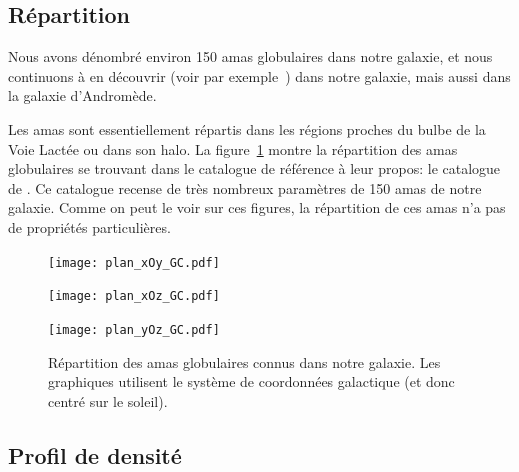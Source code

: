 		\subsection{Répartition}

			Nous avons dénombré environ 150 amas globulaires dans
			notre galaxie, et nous continuons à en découvrir (voir par
			exemple~\cite{2014ApJ...786L...3L}) dans notre galaxie, mais aussi dans la galaxie d'Andromède.

			Les amas sont essentiellement répartis dans les régions proches du
			bulbe de la Voie Lactée ou dans son halo.
			La figure~\ref{Fig::Intro::repartition} montre la répartition des amas
			globulaires se trouvant dans le catalogue de référence à leur propos: le
			catalogue de \cite{Harris}. Ce catalogue recense de très nombreux paramètres
			de 150 amas de notre galaxie.
			Comme on peut le voir sur ces figures, la répartition de ces amas n'a pas de propriétés particulières.

			\begin{figure}[h]
				\centering
					\begin{center}
				\begin{minipage}{0.33\linewidth}
						\texttt{[image: plan\_xOy\_GC.pdf]}
				\end{minipage}\hfill
				\begin{minipage}{0.33\linewidth}
						\texttt{[image: plan\_xOz\_GC.pdf]}
				\end{minipage}\hfill
				\begin{minipage}{0.33\linewidth}
						\texttt{[image: plan\_yOz\_GC.pdf]}
				\end{minipage}
					\end{center}
				\caption{\label{Fig::Intro::repartition}Répartition des amas globulaires connus dans
				notre galaxie. Les graphiques utilisent le système de coordonnées galactique (et donc centré sur le soleil).}
			\end{figure}


		\subsection{Profil de densité}

